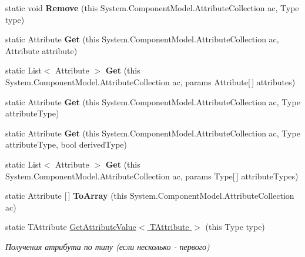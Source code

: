 \begin{DoxyCompactItemize}
static void {\bfseries Remove} (this System.\+Component\+Model.\+Attribute\+Collection ac, Type type)
\item 
\mbox{\label{class_tools_1_1_extensions_1_1_attribute_collection_extension_ae8c0ad7b02cdbe8b00ccb565584c948a}} 
static Attribute {\bfseries Get} (this System.\+Component\+Model.\+Attribute\+Collection ac, Attribute attribute)
\item 
\mbox{\label{class_tools_1_1_extensions_1_1_attribute_collection_extension_af08477f72b806b2ca0116b2671383290}} 
static List$<$ Attribute $>$ {\bfseries Get} (this System.\+Component\+Model.\+Attribute\+Collection ac, params Attribute\mbox{[}$\,$\mbox{]} attributes)
\item 
\mbox{\label{class_tools_1_1_extensions_1_1_attribute_collection_extension_ad3069ed1cc7a0cff50d608ec1f08261e}} 
static Attribute {\bfseries Get} (this System.\+Component\+Model.\+Attribute\+Collection ac, Type attribute\+Type)
\item 
\mbox{\label{class_tools_1_1_extensions_1_1_attribute_collection_extension_afb36facc0a7719809e6e85957f7e714e}} 
static Attribute {\bfseries Get} (this System.\+Component\+Model.\+Attribute\+Collection ac, Type attribute\+Type, bool derived\+Type)
\item 
\mbox{\label{class_tools_1_1_extensions_1_1_attribute_collection_extension_ac74e4653100baf63a304e17fb1963367}} 
static List$<$ Attribute $>$ {\bfseries Get} (this System.\+Component\+Model.\+Attribute\+Collection ac, params Type\mbox{[}$\,$\mbox{]} attribute\+Types)
\item 
\mbox{\label{class_tools_1_1_extensions_1_1_attribute_collection_extension_a385450b17098a9c7335271192cf2d988}} 
static Attribute \mbox{[}$\,$\mbox{]} {\bfseries To\+Array} (this System.\+Component\+Model.\+Attribute\+Collection ac)
\item 
static T\+Attribute \hyperlink{class_tools_1_1_extensions_1_1_attribute_collection_extension_a1f4b85797e4de84a1c3f535358d881d0}{Get\+Attribute\+Value$<$ T\+Attribute $>$} (this Type type)
\begin{DoxyCompactList}\small\item\em Получения атрибута по типу (если несколько -\/ первого) \end{DoxyCompactList}\end{DoxyCompactItemize}


